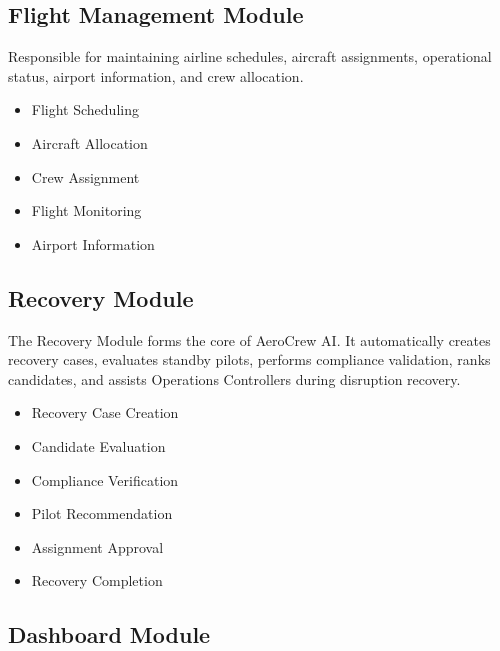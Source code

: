 \documentclass[12pt,a4paper]{report}
\begin{document}
\subsection{Flight Management Module}

Responsible for maintaining airline schedules, aircraft assignments, operational status, airport information, and crew allocation.

\begin{itemize}

\item Flight Scheduling

\item Aircraft Allocation

\item Crew Assignment

\item Flight Monitoring

\item Airport Information

\end{itemize}

\subsection{Recovery Module}

The Recovery Module forms the core of AeroCrew AI. It automatically creates recovery cases, evaluates standby pilots, performs compliance validation, ranks candidates, and assists Operations Controllers during disruption recovery.

\begin{itemize}

\item Recovery Case Creation

\item Candidate Evaluation

\item Compliance Verification

\item Pilot Recommendation

\item Assignment Approval

\item Recovery Completion

\end{itemize}

\subsection{Dashboard Module}
\end{document}
